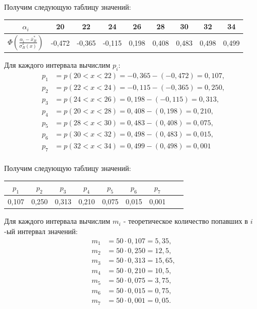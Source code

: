 \documentclass[utf8, a4paper, 14pt, russian, oneside]{book}
\begin{document}
Получим следующую таблицу значений:
\begin{table}[h!]
    \centering
    \begin{tabular}{|c|c|c|c|c|c|c|c|c|}
        \hline
        $\alpha_i$  & 20 & 22 & 24 & 26 & 28 & 30 & 32 & 34\\
        \hline
        $\Phi(\tfrac{\alpha_i - \overline{x}_B^*}{\sigma_B^*(x)})$ & -0,472 & -0,365 & -0,115 & 0,198 & 0,408 & 0,483 & 0,498 & 0,499\\
        \hline
    \end{tabular}
\end{table}

Для каждого интервала вычислим $p_i$:
\begin{align*}
    p_1 &= p(20 < x < 22) = -0,365 - ( -0,472 ) = 0,107, \\
    p_2 &= p(22 < x < 24) = -0,115 - ( -0,365 ) = 0,250, \\
    p_3 &= p(24 < x < 26) =  0,198 - ( -0,115 ) = 0,313, \\
    p_4 &= p(20 < x < 28) =  0,408 - (  0,198 ) = 0,210, \\
    p_5 &= p(28 < x < 30) =  0,483 - (  0,408 ) = 0,075, \\
    p_6 &= p(30 < x < 32) =  0,498 - (  0,483 ) = 0,015, \\
    p_7 &= p(32 < x < 34) =  0,499 - (  0,498 ) = 0,001 \\
\end{align*}

Получим следующую таблицу значений:
\begin{table}[h!]
    \centering
    \begin{tabular}{|c|c|c|c|c|c|c|c|c|}
        \hline
        $p_1$ & $p_2$ &$p_3$ &$p_4$ &$p_5$ &$p_6$ &$p_7$ \\
        \hline
        0,107 & 0,250 & 0,313 & 0,210 & 0,075 & 0,015 & 0,001 \\
        \hline
    \end{tabular}
\end{table}

Для каждого интервала вычислим $m_i$ - теоретическое количество попавших в $i$-ый интервал значений:
\begin{align*}
    m_1 &= 50 \cdot 0,107 = 5,35, \\
    m_2 &= 50 \cdot 0,250 = 12,5, \\
    m_3 &= 50 \cdot 0,313 = 15,65,\\
    m_4 &= 50 \cdot 0,210 = 10,5,\\
    m_5 &= 50 \cdot 0,075 = 3,75,\\
    m_6 &= 50 \cdot 0,015 = 0,75,\\
    m_7 &= 50 \cdot 0,001 = 0,05.
\end{align*}
\end{document}
